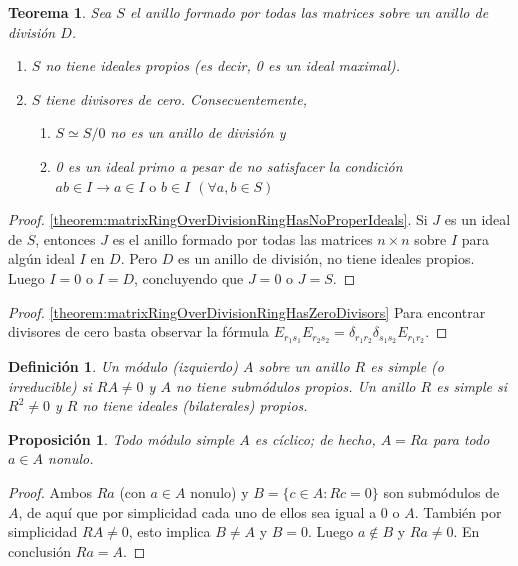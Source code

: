 \documentclass{report}
\newtheorem{theorem}{Teorema}
\newtheorem{proposition}{Proposición}
\newtheorem{definition}{Definición}
\begin{document}
  \begin{theorem}
    \label{theorem:idealsInTheRingOfMatricesOverADivisionRing}
    Sea \(S\) el anillo formado por todas las matrices sobre un anillo de división \(D\).
    \begin{enumerate}
      \item
        \label{theorem:matrixRingOverDivisionRingHasNoProperIdeals}
        \(S\) no tiene ideales propios (es decir, 0 es un ideal maximal).
      \item \label{theorem:matrixRingOverDivisionRingHasZeroDivisors} \(S\) tiene divisores de cero.
      Consecuentemente,
      \begin{enumerate}
        \item \(S \simeq S / 0\) no es un anillo de división y
        \item 0 es un ideal primo a pesar de no satisfacer la condición \(a b \in I \rightarrow {a \in I} \text{ o } {b \in I}\) \((\forall a, b \in S)\)
      \end{enumerate}
    \end{enumerate}
  \end{theorem}
  \begin{proof} \ref{theorem:matrixRingOverDivisionRingHasNoProperIdeals}.
    Si \(J\) es un ideal de \(S\), entonces \(J\) es el anillo formado por todas las matrices \(n \times n\) sobre \(I\) para algún ideal \(I\) en \(D\).
    Pero \(D\) es un anillo de división, no tiene ideales propios.
    Luego \(I = 0\) o \(I = D\), concluyendo que \(J = 0\) o \(J = S\).
  \end{proof}
  \begin{proof} \ref{theorem:matrixRingOverDivisionRingHasZeroDivisors}
    Para encontrar divisores de cero basta observar la fórmula \(E_{r_1 s_1} E_{r_2 s_2} = \delta_{r_1 r_2} \delta_{s_1 s_2} E_{r_1 r_2}\).
  \end{proof}


  \begin{definition}
    Un módulo (izquierdo) \(A\) sobre un anillo \(R\) es \emph{simple} (o \emph{irreducible}) si \(R A \neq 0\) y \(A\) no tiene submódulos propios.
    Un anillo \(R\) es \emph{simple} si \(R^2 \neq 0\) y \(R\) no tiene ideales (bilaterales) propios.
  \end{definition}

  \begin{proposition}
    Todo módulo simple \(A\) es cíclico; de hecho, \(A = R a\) para todo \(a \in A\) nonulo.
  \end{proposition}
  \begin{proof}
    Ambos \(Ra\) (con \(a \in A\) nonulo) y \(B = \{c \in A : R c = 0\}\) son submódulos de \(A\), de aquí que por simplicidad cada uno de ellos sea igual a 0 o \(A\).
    También por simplicidad \(R A \neq 0\), esto implica \(B \neq A\) y \(B = 0\).
    Luego \(a \notin B\) y \(R a \neq 0\).
    En conclusión \(R a = A\).
  \end{proof}
\end{document}
